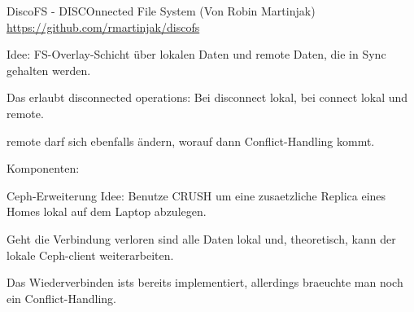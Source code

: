 \documentclass[hyperref={xetex}]{beamer}
\begin{document}
\begin{frame}{DiscoFS - DISCOnnected File System}
(Von Robin Martinjak) \href{DiscoFS}{https://github.com/rmartinjak/discofs}

Idee: FS-Overlay-Schicht über lokalen Daten und remote Daten, die in Sync gehalten werden.

Das erlaubt disconnected operations: Bei disconnect lokal, bei connect lokal und remote. 

remote darf sich ebenfalls ändern,  worauf dann Conflict-Handling kommt.

Komponenten: 

\end{frame}

\begin{frame}{Ceph-Erweiterung}
Idee: Benutze CRUSH um eine zusaetzliche Replica eines Homes lokal auf dem Laptop abzulegen.

Geht die Verbindung verloren sind alle Daten lokal und, theoretisch, kann der lokale Ceph-client 
weiterarbeiten.

Das Wiederverbinden ists bereits implementiert, allerdings braeuchte man noch ein Conflict-Handling.




\end{frame}
\end{document}

